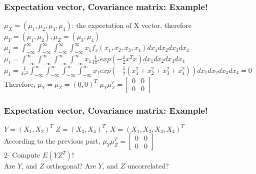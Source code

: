 \documentclass{beamer}
\begin{document}
\begin{frame}
\frametitle{Expectation vector, Covariance matrix: Example!}
$\mu_X=(\mu_1,\mu_2,\mu_3,\mu_4)$: the expectation of X vector, therefore\newline\\
$\mu_Y=(\mu_1,\mu_2), \mu_Z = (\mu_3,\mu_4)$\newline\\

$\mu_1 = \int_{-\infty}^{\infty}\int_{-\infty}^{\infty}\int_{-\infty}^{\infty} \int_{-\infty}^{\infty}  x_1f_x(x_1,x_2,x_3,x_4)dx_1dx_2dx_3dx_4$\newline\\
$\mu_1 = \int_{-\infty}^{\infty}\int_{-\infty}^{\infty}\int_{-\infty}^{\infty} \int_{-\infty}^{\infty}  x_1\frac{1}{4\pi^2}{exp(-\frac{1}{2}x^Tx)}dx_1dx_2dx_3dx_4 $ \newline\\
$\mu_1 = \frac{1}{4\pi^2} \int_{-\infty}^{\infty}\int_{-\infty}^{\infty}\int_{-\infty}^{\infty} \int_{-\infty}^{\infty} x_1exp(-\frac{1}{2}(x_1^2+x_2^2+x_3^2+x_4^2))dx_1dx_2dx_3dx_4 = 0$\newline\\
Therefore, $\mu_Y=\mu_Z=(0,0)^T$
$\mu_Y \mu_Z^T=
\begin{bmatrix}
    0&0 \\
0&0
\end{bmatrix}$
\end{frame}

\begin{frame}
\frametitle{Expectation vector, Covariance matrix: Example!}
 $Y = (X_1,X_2)^T$
 \newline $Z=(X_3,X_4)^T$,
 \newline $X= (X_1,X_2,X_3,X_4)^T$\newline\\
According to the previous part, $\mu_Y\mu_Z^T =\begin{bmatrix}
    0&0 \\
0&0
\end{bmatrix}
$
\newline\\
2- Compute $E(YZ^T)$!\newline\\
Are $Y$, and $Z$ orthogonal?
Are $Y$, and $Z$ uncorrelated?

\end{frame}
\end{document}
